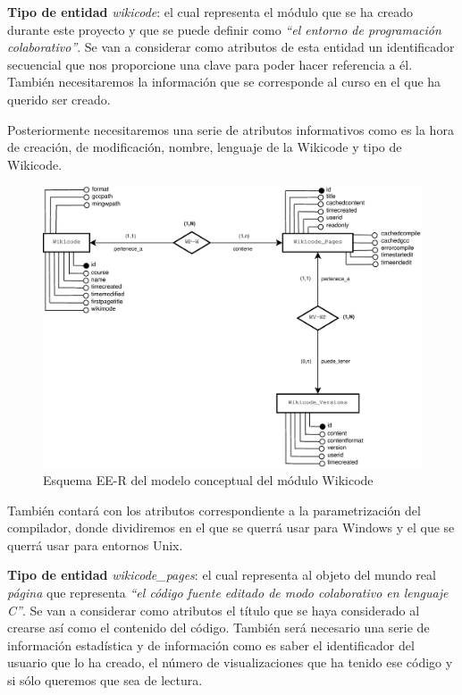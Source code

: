 \begin{description}
	\item{\textbf{Tipo de entidad}} \emph{wikicode}: el cual representa el módulo que se ha creado durante este proyecto y que se puede definir como \emph{``el entorno de programación colaborativo''}. Se van a considerar como atributos de esta entidad un identificador secuencial que nos proporcione una clave para poder hacer referencia a él. También necesitaremos la información que se corresponde al curso en el que ha querido ser creado. 
	
	Posteriormente necesitaremos una serie de atributos informativos como es la hora de creación, de modificación, nombre, lenguaje de la Wikicode y tipo de Wikicode. 

\begin{figure}[h]
	\centering
	\includegraphics[width=\textwidth]{./img/EER.eps}
	\caption{Esquema EE-R del modelo conceptual del módulo Wikicode}
\end{figure}
	
	También contará con los atributos correspondiente a la parametrización del compilador, donde dividiremos en el que se querrá usar para Windows y el que se querrá usar para entornos Unix.
	
	\item{\textbf{Tipo de entidad}} \emph{wikicode\_pages}: el cual representa al objeto del mundo real \emph{página} que representa \emph{``el código fuente editado de modo colaborativo en lenguaje C''}. Se van a considerar como atributos el título que se haya considerado al crearse así como el contenido del código. También será necesario una serie de información estadística y de información como es saber el identificador del usuario que lo ha creado, el número de visualizaciones que ha tenido ese código y si sólo queremos que sea de lectura.
	

\end{description}
